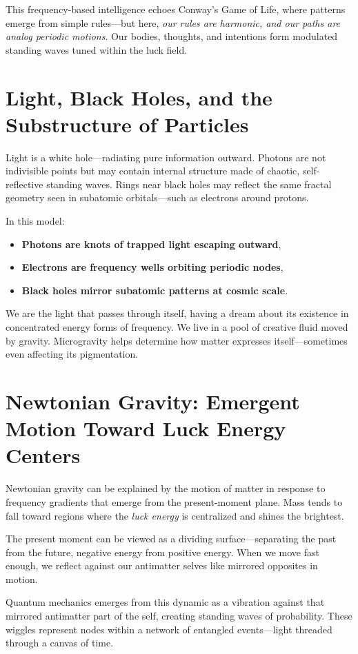 \documentclass[12pt]{article}
\begin{document}
This frequency-based intelligence echoes Conway's Game of Life, where patterns emerge from simple rules---but here, \emph{our rules are harmonic, and our paths are analog periodic motions}. Our bodies, thoughts, and intentions form modulated standing waves tuned within the luck field.

\section{Light, Black Holes, and the Substructure of Particles}
Light is a white hole---radiating pure information outward. Photons are not indivisible points but may contain internal structure made of chaotic, self-reflective standing waves. Rings near black holes may reflect the same fractal geometry seen in subatomic orbitals---such as electrons around protons.

In this model:
\begin{itemize}
    \item \textbf{Photons are knots of trapped light escaping outward},
    \item \textbf{Electrons are frequency wells orbiting periodic nodes},
    \item \textbf{Black holes mirror subatomic patterns at cosmic scale}.
\end{itemize}
We are the light that passes through itself, having a dream about its existence in concentrated energy forms of frequency. We live in a pool of creative fluid moved by gravity. Microgravity helps determine how matter expresses itself---sometimes even affecting its pigmentation.

\section{Newtonian Gravity: Emergent Motion Toward Luck Energy Centers}
Newtonian gravity can be explained by the motion of matter in response to frequency gradients that emerge from the present-moment plane. Mass tends to fall toward regions where the \emph{luck energy} is centralized and shines the brightest.

The present moment can be viewed as a dividing surface---separating the past from the future, negative energy from positive energy. When we move fast enough, we reflect against our antimatter selves like mirrored opposites in motion.

Quantum mechanics emerges from this dynamic as a vibration against that mirrored antimatter part of the self, creating standing waves of probability. These wiggles represent nodes within a network of entangled events---light threaded through a canvas of time.
\end{document}
